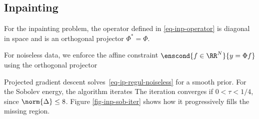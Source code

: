                                                  
\subsection{Inpainting}
\label{sec-inpainting-variational}

For the inpainting problem, the operator defined in \eqref{eq-inp-operator} is diagonal in space
and is an orthogonal projector $\Phi^* = \Phi$.

For noiseless data, we enforce the affine constraint $\enscond{f \in \RR^N}{y=\Phi f}$ using the orthogonal projector


Projected gradient descent solves~\eqref{eq-ip-regul-noiseless} for a smooth prior.
For the Sobolev energy, the algorithm iterates
The iteration converges if $0<\tau<1/4$, since $\norm{\Delta}\leq8$. Figure \ref{fig-inp-sob-iter} shows how it progressively fills the missing region.

                                                                                                         

                                        
   
                                                                                                                                                                                                           
                          


           
          
                                        
                                            
                                        
                                                
  
    
                                                               
                     

